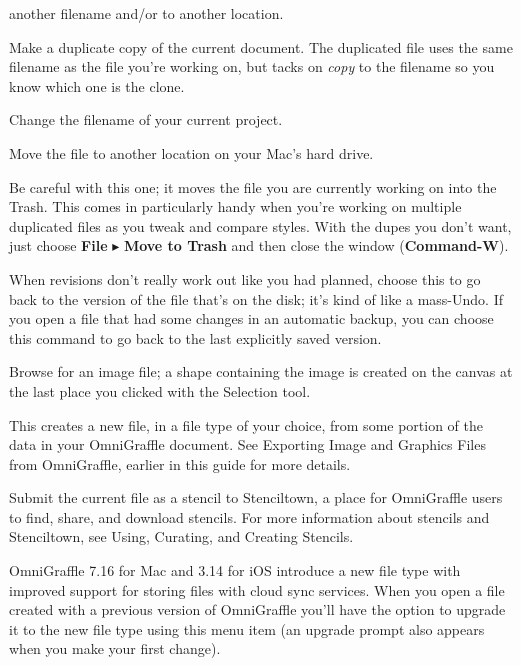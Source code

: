 \documentclass[../main.tex]{subfiles}
\begin{document}
\begin{description}[style=nextline]
    another filename and/or to another location.
  \item[{Duplicate (\textbf{Shift-Command-S})}] Make a duplicate copy of the current document.
    The duplicated file uses the same filename as the file you're working on, but tacks on
    \textit{copy} to the filename so you know which one is the clone.
  \item[{Rename}] Change the filename of your current project.
  \item[{Move To}] Move the file to another location on your Mac's hard drive.
  \item[{Move to Trash}] Be careful with this one; it moves the file you are currently working
    on into the Trash. This comes in particularly handy when you're working on multiple
    duplicated files as you tweak and compare styles. With the dupes you don't want, just choose
    \textbf{File} $\blacktriangleright$ \textbf{Move to Trash} and then close the window
    (\textbf{Command-W}).
  \item[{Revert To}] When revisions don't really work out like you had planned, choose this to
    go back to the version of the file that's on the disk; it's kind of like a mass-Undo. If you
    open a file that had some changes in an automatic backup, you can choose this command to go
    back to the last explicitly saved version.
  \item[{Place Image}] Browse for an image file; a shape containing the image is created on the
    canvas at the last place you clicked with the Selection tool.
  \item[{Export (\textbf{Option-Command-E})}] This creates a new file, in a file type of your
    choice, from some portion of the data in your OmniGraffle document. See Exporting Image and
    Graphics Files from OmniGraffle, earlier in this guide for more details.
  \item[{Submit to Stenciltown}] Submit the current file as a stencil to Stenciltown, a place
    for OmniGraffle users to find, share, and download stencils. For more information about
    stencils and Stenciltown, see Using, Curating, and Creating Stencils.
  \item[{Upgrade File}] OmniGraffle 7.16 for Mac and 3.14 for iOS introduce a new file type with
    improved support for storing files with cloud sync services. When you open a file created
    with a previous version of OmniGraffle you'll have the option to upgrade it to the new file
    type using this menu item (an upgrade prompt also appears when you make your first change).


\end{description}
\end{document}
